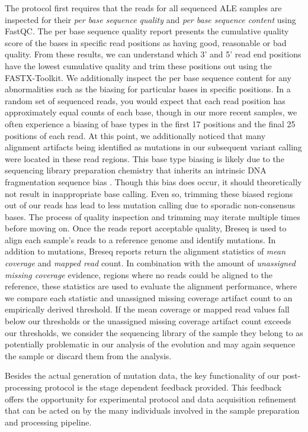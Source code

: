 \documentclass[12pt,final,masters,chapterheads]{ucsd}  %
\begin{document}
The protocol first requires that the reads for all sequenced ALE samples are inspected for their \textit{per base sequence quality} and \textit{per base sequence content} using FastQC. The per base sequence quality report presents the cumulative quality score of the bases in specific read positions as having good, reasonable or bad quality. From these results, we can understand which 3' and 5' read end positions have the lowest cumulative quality and trim these positions out using the FASTX-Toolkit. We additionally inspect the per base sequence content for any abnormalities such as the biasing for particular bases in specific positions. In a random set of sequenced reads, you would expect that each read position has approximately equal counts of each base, though in our more recent samples, we often experience a biasing of base types in the first 17 positions and the final 25 positions of each read. At this point, we additionally noticed that many alignment artifacts being identified as mutations in our subsequent variant calling were located in these read regions. This base type biasing is likely due to the sequencing library preparation chemistry that inherits an intrinsic DNA fragmentation sequence bias \cite{Head2014}. Though this bias does occur, it should theoretically not result in inappropriate base calling. Even so, trimming these biased regions out of our reads has lead to less mutation calling due to sporadic non-consensus bases. The process of quality inspection and trimming may iterate multiple times before moving on. Once the reads report acceptable quality, Breseq is used to align each sample's reads to a reference genome and identify mutations. In addition to mutations, Breseq reports return the alignment statistics of \textit{mean coverage} and \textit{mapped read} count. In combination with the amount of \textit{unassigned missing coverage} evidence, regions where no reads could be aligned to the reference, these statistics are used to evaluate the alignment performance, where we compare each statistic and unassigned missing coverage artifact count to an empirically derived threshold. If the mean coverage or mapped read values fall below our thresholds or the unassigned missing coverage artifact count exceeds our thresholds, we consider the sequencing library of the sample they belong to as potentially problematic in our analysis of the evolution and may again sequence the sample or discard them from the analysis.

Besides the actual generation of mutation data, the key functionality of our post-processing protocol is the stage dependent feedback provided. This feedback offers the opportunity for experimental protocol and data acquisition refinement that can be acted on by the many individuals involved in the sample preparation and processing pipeline.
\end{document}
